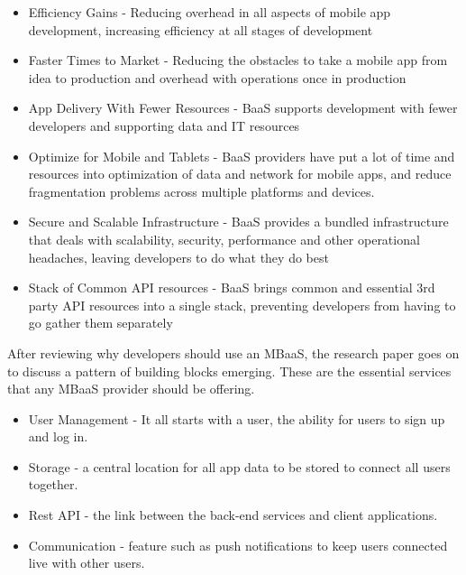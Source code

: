 \begin{itemize}
  \item Efficiency Gains
    - Reducing overhead in all aspects of mobile app development, increasing efficiency at all stages of development
  \item Faster Times to Market
    - Reducing the obstacles to take a mobile app from idea to production and overhead with operations once in production
  \item App Delivery With Fewer Resources
    - BaaS supports development with fewer developers and supporting data and IT resources
  \item Optimize for Mobile and Tablets
    - BaaS providers have put a lot of time and resources into optimization of data and network for mobile apps, and reduce fragmentation problems across multiple platforms and devices.
  \item Secure and Scalable Infrastructure
    -  BaaS provides a bundled infrastructure that deals with scalability, security, performance and other operational headaches, leaving developers to do what they do best
  \item Stack of Common API resources 
    - BaaS brings common and essential 3rd party API resources into a single stack, preventing developers from having to go gather them separately
\end{itemize}

After reviewing why developers should use an MBaaS, the research paper goes on to discuss a pattern of building blocks emerging. These are the essential services that any MBaaS provider should be offering.

\begin{itemize}
  \item User Management
    - It all starts with a user, the ability for users to sign up and log in.
  \item Storage
    - a central location for all app data to be stored to connect all users together.
  \item Rest API
    - the link between the back-end services and client applications.
  \item Communication
    - feature such as push notifications to keep users connected live with other users.
\end{itemize}


